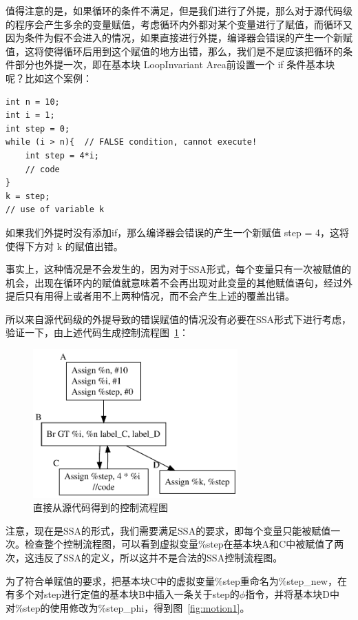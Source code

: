 值得注意的是，如果循环的条件不满足，但是我们进行了外提，那么对于源代码级的程序会产生多余的变量赋值，考虑循环内外都对某个变量进行了赋值，而循环又因为条件为假不会进入的情况，如果直接进行外提，编译器会错误的产生一个新赋值，这将使得循环后用到这个赋值的地方出错，那么，我们是不是应该把循环的条件部分也外提一次，即在基本块 LoopInvariant Area前设置一个 if 条件基本块呢？比如这个案例：

\begin{verbatim}
int n = 10;
int i = 1;
int step = 0;
while (i > n){  // FALSE condition, cannot execute!
	int step = 4*i; 
	// code
}
k = step;
// use of variable k
\end{verbatim}

如果我们外提时没有添加if，那么编译器会错误的产生一个新赋值 step = 4，这将使得下方对 k 的赋值出错。

事实上，这种情况是不会发生的，因为对于SSA形式，每个变量只有一次被赋值的机会，出现在循环内的赋值就意味着不会再出现对此变量的其他赋值语句，经过外提后只有用得上或者用不上两种情况，而不会产生上述的覆盖出错。

所以来自源代码级的外提导致的错误赋值的情况没有必要在SSA形式下进行考虑，验证一下，由上述代码生成控制流程图~\ref{fig:motion0}：

\begin{figure}[htb]
  \centering
  \includegraphics[width=0.7\textwidth]{figures/codeMotion.pdf}
  \caption{直接从源代码得到的控制流程图}
  \label{fig:motion0}
\end{figure}

注意，现在是SSA的形式，我们需要满足SSA的要求，即每个变量只能被赋值一次。检查整个控制流程图，可以看到虚拟变量\%step在基本块A和C中被赋值了两次，这违反了SSA的定义，所以这并不是合法的SSA控制流程图。

为了符合单赋值的要求，把基本块C中的虚拟变量\%step重命名为\%step\_new，在有多个对step进行定值的基本块B中插入一条关于step的$\phi$指令，并将基本块D中对\%step的使用修改为\%step\_phi，得到图~\ref{fig:motion1}。

